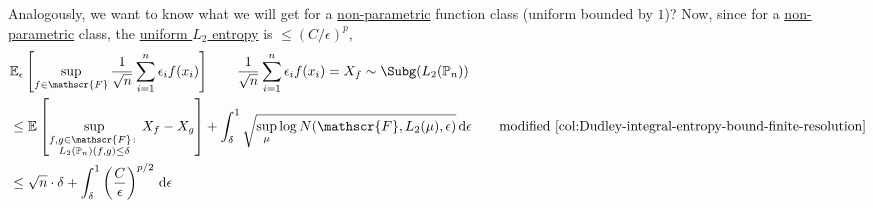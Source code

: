 Analogously, we want to know what we will get for a \hyperref[def:non-parametric]{non-parametric} function class (uniform bounded by \(1\))? Now, since for a \hyperref[def:non-parametric]{non-parametric} class, the \hyperref[def:Koltchinskii-Pollard-entropy]{uniform \(L_2\) entropy} is \(\leq (C / \epsilon )^p\),
\begin{align*}
	 & \mathbb{E}_{\epsilon }\left[  \sup _{f\in \mathscr{F} } \frac{1}{\sqrt{n} } \sum_{i=1}^{n} \epsilon _i f(x_i)\right] \tag*{\(\displaystyle \frac{1}{\sqrt{n} } \sum_{i=1}^{n} \epsilon _i f(x_i) = X_f \sim \Subg(L_2(\mathbb{P} _n))\)} \\
	 & \leq \mathbb{E}_{}\left[\sup _{\substack{f, g\in \mathscr{F} \colon                                                                                                                                                                      \\ L_2(\mathbb{P} _n) (f, g) \leq \delta }} X_f - X_g \right] + \int_{\delta }^{1} \sqrt{\sup _\mu \log N(\mathscr{F} , L_2(\mu ), \epsilon )} \,\mathrm{d}\epsilon \tag*{modified \autoref{col:Dudley-integral-entropy-bound-finite-resolution}} \\
	 & \leq \sqrt{n} \cdot \delta + \int_{\delta }^{1} \left( \frac{C}{\epsilon } \right) ^{p / 2} \,\mathrm{d}\epsilon
\end{align*}

